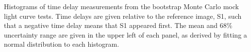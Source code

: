 \label{fig:TimeDelayHistograms}
Histograms of time delay measurements from the bootstrap Monte Carlo mock light curve tests.  Time delays are given relative to the reference image, S1, such that a negative time delay means that S1 appeared first.   The mean and 68\% uncertainty range are given in the upper left of each panel, as derived by fitting a normal distribution to each histogram. 
